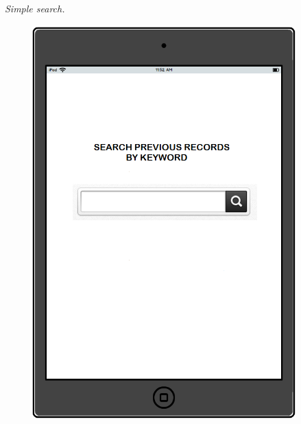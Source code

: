 \documentclass[twoside,letterpaper]{article}
\begin{document}
\newpage
{\itshape\color{black}
Simple search. 
}
\begin{figure}[H]
\centering
\renewcommand{\figurename}{SearchSimple}
\includegraphics[width=4in,height=6in]{search_mockup.png}
\end{figure}
\end{document}
